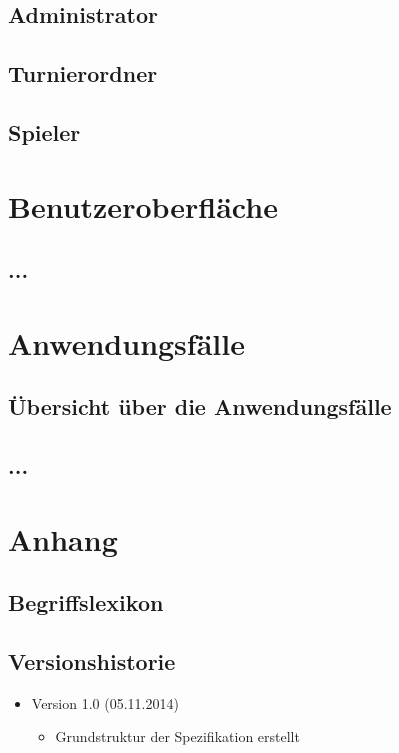\documentclass[11pt]{article}
\begin{document}
\subsection{Administrator}

\subsection{Turnierordner}

\subsection{Spieler}

\section{Benutzeroberfläche}

\subsection{...}

\section{Anwendungsfälle}

\subsection{Übersicht über die Anwendungsfälle}

\subsection{...}

\section{Anhang}

\subsection{Begriffslexikon}

\subsection{Versionshistorie}

\begin{itemize}
	\item Version 1.0 (05.11.2014)
	\begin{itemize}
		\item Grundstruktur der Spezifikation erstellt
	\end{itemize}
\end{itemize}
\end{document}
